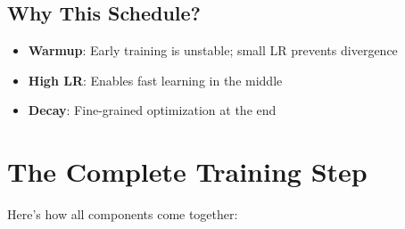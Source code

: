 \subsection{Why This Schedule?}

\begin{itemize}
    \item \textbf{Warmup}: Early training is unstable; small LR prevents divergence
    \item \textbf{High LR}: Enables fast learning in the middle
    \item \textbf{Decay}: Fine-grained optimization at the end
\end{itemize}

\section{The Complete Training Step}

Here's how all components come together:

